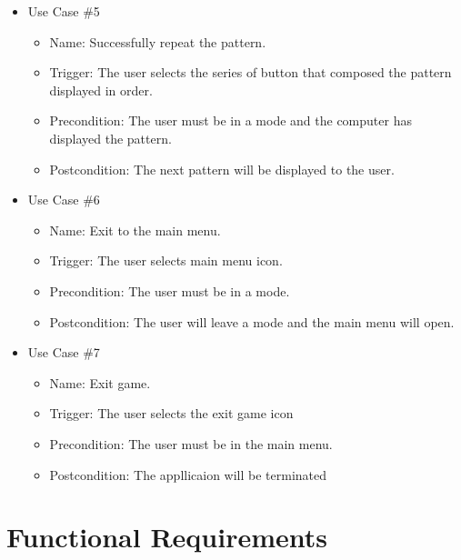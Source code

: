 \documentclass[12pt, titlepage]{article}
\begin{document}
\begin{itemize}
\item Use Case \#5
\begin{itemize}
\item Name: Successfully repeat the pattern.
\item Trigger: The user selects the series of button that composed the pattern displayed in order.
\item Precondition: The user must be in a mode and the computer has displayed the pattern.
\item Postcondition: The next pattern will be displayed to the user.
\end{itemize}

\item Use Case \#6
\begin{itemize}
\item Name: Exit to the main menu.
\item Trigger: The user selects main menu icon.
\item Precondition: The user must be in a mode. 
\item Postcondition: The user will leave a mode and the main menu will open.
\end{itemize}

\item Use Case \#7
\begin{itemize}
\item Name: Exit game.
\item Trigger: The user selects the exit game icon
\item Precondition: The user must be in the main menu. 
\item Postcondition: The appllicaion will be terminated
\end{itemize}

\end{itemize}




\section{Functional Requirements}
\end{document}
